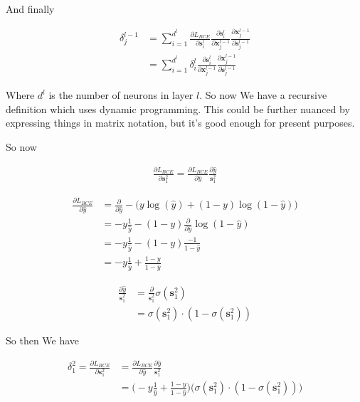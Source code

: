 \documentclass{article}
\begin{document}
	And finally 
	
	\begin{align}
		\delta^{l-1}_j &= \sum^{d^l}_{i=1}\frac{\partial L_{BCE}}{\partial \mathbf{s}^l_i} \frac{\partial \mathbf{s}^l_i}{\partial \mathbf{x}^{l-1}_j}\frac{\partial \mathbf{x}^{l-1}_j}{\partial \mathbf{s}^{l-1}_j}\\
		&= \sum^{d^l}_{i=1}  \delta^l_i \frac{\partial \mathbf{s}^l_i}{\partial \mathbf{x}^{l-1}_j}\frac{\partial \mathbf{x}^{l-1}_j}{\partial \mathbf{s}^{l-1}_j}
	\end{align}
	
	Where $d^l$ is the number of neurons in layer $l$. So now We have a recursive definition which uses dynamic programming. This could be further nuanced by expressing things in matrix notation, but it's good enough for present purposes.
	
	
	 
	 So now
	 
	 \begin{align}
	 	\frac{\partial L_{BCE}}{\partial \mathbf{s}^2_1} = \frac{\partial L_{BCE}}{\partial \hat{y}} \frac{\partial \hat{y}}{\mathbf{s}^2_1} 
	 \end{align}
	 
	 \begin{align}
	 	\frac{\partial L_{BCE}}{\partial \hat{y}} &= \frac{\partial }{\partial \hat{y}}-\big(y\log(\hat{y}) + (1-y)\log(1-\hat{y}) \big)\\
	 	&=-y\frac{1}{\hat{y}}  - (1-y)\frac{\partial }{\partial \hat{y}} \log(1-\hat{y}) \\
	 	&=-y\frac{1}{\hat{y}}  - (1-y)\frac{-1}{1-\hat{y}}\\
	 	&=-y\frac{1}{\hat{y}}  + \frac{1-y}{1-\hat{y}}
	 \end{align}
	 
	 \begin{align}
	 	\frac{\partial \hat{y}}{\mathbf{s}^2_1}  &= \frac{\partial }{\mathbf{s}^2_1} \sigma(\mathbf{s}^2_1)\\
	 	&= \sigma(\mathbf{s}^2_1)\cdot(1-\sigma(\mathbf{s}^2_1))
	 \end{align}
	 
	 So then We have 
	
	\begin{align}
	 	\delta^2_1 = \frac{\partial L_{BCE}}{\partial \mathbf{s}^2_1} &= \frac{\partial L_{BCE}}{\partial \hat{y}} \frac{\partial \hat{y}}{\mathbf{s}^2_1} \\
	 	&= \bigg( -y\frac{1}{\hat{y}}  + \frac{1-y}{1-\hat{y}} \bigg) \bigg( \sigma(\mathbf{s}^2_1)\cdot(1-\sigma(\mathbf{s}^2_1)) \bigg)
	 \end{align}
	 
\end{document}

